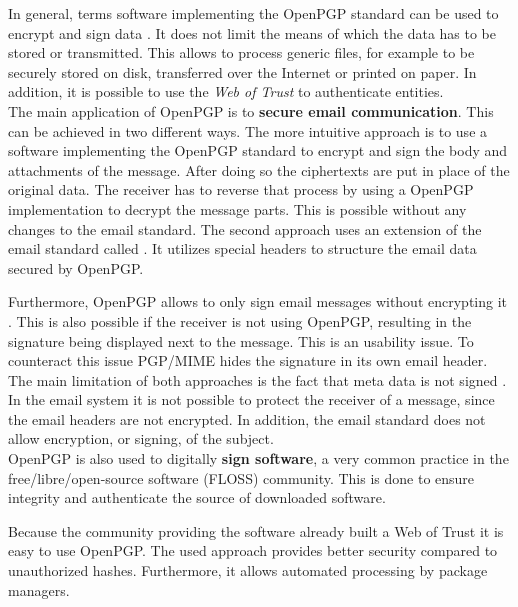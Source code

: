 In general, terms software implementing the OpenPGP standard can be used to encrypt and sign data \cite[section 2]{RFC4880}. It does not limit the means of which the data has to be stored or transmitted. This allows to process generic files, for example to be securely stored on disk, transferred over the Internet or printed on paper. In addition, it is possible to use the \textit{Web of Trust} to authenticate entities. \\  


The main application of OpenPGP is to \textbf{secure email communication}. This can be achieved in two different ways. The more intuitive approach is to use a software implementing the OpenPGP standard to encrypt and sign the body and attachments of the message. After doing so the ciphertexts are put in place of the original data. The receiver has to reverse that process by using a OpenPGP implementation to decrypt the message parts. This is possible without any changes to the email standard. The second approach uses an extension of the email standard called  \citep{RFC3156}. It utilizes special headers to structure the email data secured by OpenPGP.

Furthermore, OpenPGP allows to only sign email messages without encrypting it \cite[section 7]{RFC4880}. This is also possible if the receiver is not using OpenPGP, resulting in the signature being displayed next to the message. This is an usability issue. To counteract this issue PGP/MIME hides the signature in its own email header. \\


The main limitation of both approaches is the fact that meta data is not signed \cite{Green2014}. In the email system it is not possible to protect the receiver of a message, since the email headers are not encrypted. In addition, the email standard does not allow encryption, or signing, of the subject. \\

OpenPGP is also used to digitally \textbf{sign software}, a very common practice in the free/libre/open-source software (FLOSS) community. This is done to ensure integrity and authenticate the source of downloaded software. 

Because the community providing the software already built a Web of Trust it is easy to use OpenPGP. The used approach provides better security compared to unauthorized hashes. Furthermore, it allows automated processing by package managers. \\


